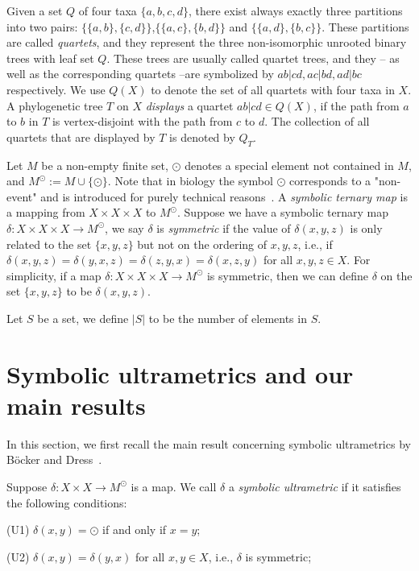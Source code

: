 \documentclass{article}
\begin{document}
Given a set $Q$ of four taxa $\{a,b,c,d\}$,  
there exist always exactly three partitions into two pairs: 
$\{\{a,b\},\{c,d\}\}$,$\{\{a,c\},\{b,d\}\}$ and $\{\{a,d\},\{b,c\}\}$. 
These partitions are called {\em quartets}, and they 
represent the three non-isomorphic unrooted binary trees with leaf set $Q$. These 
trees are usually called quartet trees, and they -- as well as the corresponding 
quartets
--are symbolized by
$ab|cd, ac|bd, ad|bc$ respectively. We use $Q(X)$ to denote the set of all quartets 
with four taxa in $X$. A phylogenetic tree $T$ on $X$ {\em displays} a quartet
$ab|cd \in Q(X)$, if the path from $a$ to $b$ in $T$ is vertex-disjoint with the path from 
$c$ to $d$. The collection of all quartets that are displayed by $T$ is denoted by $Q_T$. 


Let $M$ be a non-empty finite set, $\odot$ denotes a special element not 
contained in $M$,
and $M^{\odot}:= M\cup \{\odot\}$. Note that in biology the symbol $\odot$ 
corresponds to
a "non-event" and is introduced for purely technical 
reasons~\cite{Hellmuth2013}. A \textit{symbolic ternary map} is a mapping from $X\times X\times X$ to $M^{\odot}$. Suppose we have a symbolic ternary map $\delta: X\times X\times X 
\to M^{\odot}$,
we say $\delta$ is \textit{symmetric}
if the value of
$\delta(x,y,z)$ is only related to the set $\{x,y,z\}$ but not on the 
ordering of $x,y,z$, i.e., if $\delta(x,y,z)=\delta(y,x,z)=\delta(z,y,x)=\delta(x,z,y)$ for all $x,y,z\in 
X$.
For simplicity, if a map $\delta: X\times X\times X \to M^{\odot}$ is 
symmetric, 
then 
we can define $\delta$ on the set $\{x,y,z\}$ to be $\delta(x,y,z)$.

Let $S$ be a set, we define $|S|$ to be the number of elements in $S$.


\section{Symbolic ultrametrics and our main results}\label{sect:result}
In this section, we first recall the main result  
concerning symbolic ultrametrics by B\"{o}cker and Dress~\cite{Bocker1998}.

Suppose $\delta: X\times X\to M^{\odot}$ is a map. We call 
$\delta$ a \textit{symbolic ultrametric} if it satisfies the following 
conditions:

(U1) $\delta(x,y)=\odot$ if and only if $x=y$;

(U2) $\delta(x,y)=\delta(y,x)$ for all $x,y\in X$, i.e., $\delta$ is symmetric;
\end{document}
